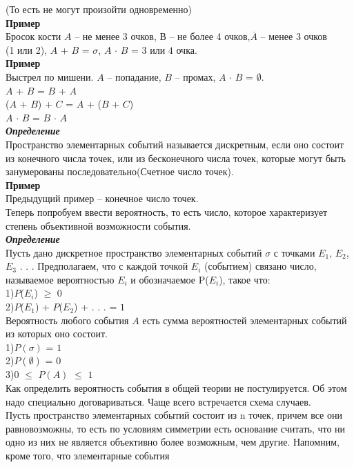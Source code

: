 \documentclass[russian, 12pt, fleqn]{article}
\begin{document}
(То есть не могут произойти одновременно)\\
\textbf{Пример\\}Бросок кости $A$ -- не менее 3 очков, $В$ -- не более 4 очков,$\overline{A}$ -- менее 3 очков\\(1 или 2), $A$ + $B$ = {$\sigma$}, $A$ $\cdot$ $B$ = $3$ или $4$ очка.\\
\textbf{Пример}\\Выстрел по мишени. $A$ -- попадание, $B$ -- промах,  $A$ $\cdot$ $B$ = $\emptyset$.\\
$A$ + $B$ = $B$ + $A$\\
($A$ + $B$) + $C$ = $A$ + ($B$ + $C$)\\
$A$ $\cdot$ $B$ = $B$  $\cdot$ $A$\\
\textit{\textbf{Определение}}\\Пространство элементарных событий называется дискретным, если оно состоит из конечного числа точек, или из бесконечного числа точек, которые могут быть занумерованы последовательно(Счетное число точек).\\
\textbf{Пример}\\Предыдущий пример -- конечное число точек.\\
Теперь попробуем ввести вероятность, то есть число, которое характеризует степень объективной возможности события.\\
\textit{\textbf{Определение}}\\Пусть дано дискретное пространство элементарных событий {$\sigma$} с точками $E_{1}$, $E_{2}$, $E_{3}$ . . .  Предполагаем, что с каждой точкой $E_{i}$ (событием) связано число, называемое вероятностью $E_{i}$ и обозначаемое P($E_{i}$), такое что:\\ 
1)$P$($E_{i}$) $\geq$ $0$  \\
2)$P$($E_{1}$) + $P$($E_{2}$) + . . . = $1$\\
Вероятность любого события $A$ есть сумма вероятностей элементарных событий из которых оно состоит.\\
1)$P(\sigma)$ = $1$\\
2)$P(\emptyset)$ = $0$\\
3)0 $\leq$ $P(A)$ $\leq$ $1$\\
Как определить вероятность события в общей теории не постулируется. Об этом надо специально договариваться. Чаще всего встречается схема случаев.\\
Пусть  пространство элементарных событий состоит из n точек, причем все они равновозможны, то есть  по условиям симметрии есть основание считать, что ни одно из них не является объективно более возможным, чем другие. Напомним, кроме того, что элементарные  события  
\end{document}
